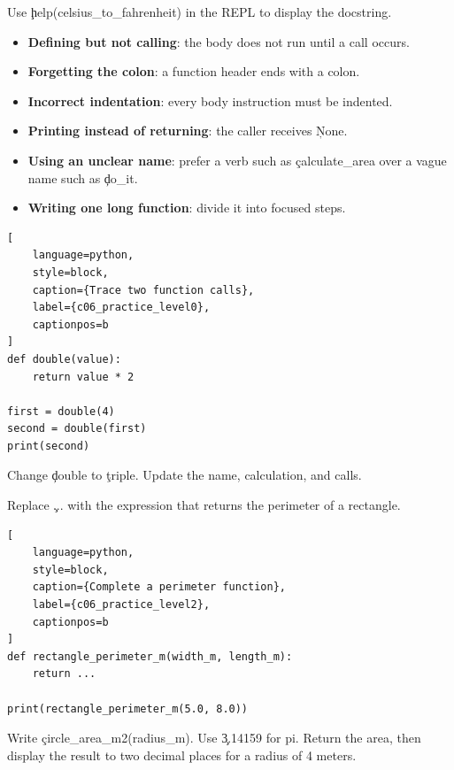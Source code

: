 Use \c{help(celsius_to_fahrenheit)} in the REPL to display the docstring.


\begin{itemize}
    \item \textbf{Defining but not calling}: the body does not run until a call occurs.
    \item \textbf{Forgetting the colon}: a function header ends with a colon.
    \item \textbf{Incorrect indentation}: every body instruction must be indented.
    \item \textbf{Printing instead of returning}: the caller receives \c{None}.
    \item \textbf{Using an unclear name}: prefer a verb such as
          \c{calculate_area} over a vague name such as \c{do_it}.
    \item \textbf{Writing one long function}: divide it into focused steps.
\end{itemize}



\begin{lstlisting}[
    language=python,
    style=block,
    caption={Trace two function calls},
    label={c06_practice_level0},
    captionpos=b
]
def double(value):
    return value * 2

first = double(4)
second = double(first)
print(second)
\end{lstlisting}


Change \c{double} to \c{triple}. Update the name, calculation, and calls.


Replace \c{...} with the expression that returns the perimeter of a rectangle.

\begin{lstlisting}[
    language=python,
    style=block,
    caption={Complete a perimeter function},
    label={c06_practice_level2},
    captionpos=b
]
def rectangle_perimeter_m(width_m, length_m):
    return ...

print(rectangle_perimeter_m(5.0, 8.0))
\end{lstlisting}


Write \c{circle_area_m2(radius_m)}. Use \c{3.14159} for pi. Return the area,
then display the result to two decimal places for a radius of 4 meters.

